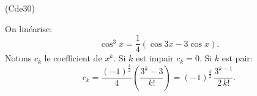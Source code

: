 \begin{tiny}(Cde30)\end{tiny} On linéarise:
\[
 \cos^3 x  = \frac{1}{4}\left( \cos 3x - 3\cos x\right). 
\]
Notons $c_k$ le coefficient de $x^k$. Si $k$ est impair $c_k=0$. Si $k$ est pair:
\[
 c_k = \frac{(-1)^\frac{k}{2}}{4}\left( \frac{3^k - 3}{k!}\right)
 = (-1)^\frac{k}{2}\,\frac{3^{k-1}}{2\,k!}. 
\]
